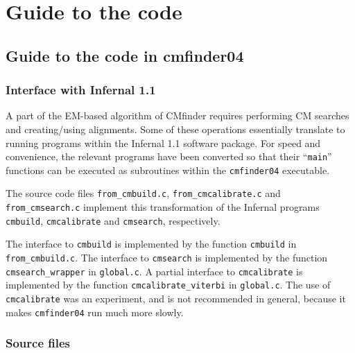 \documentclass[letterpaper,12pt]{report}
\begin{document}
\chapter{Guide to the code}

\section{Guide to the code in cmfinder04}

\subsection{Interface with Infernal 1.1}

A part of the EM-based algorithm of CMfinder requires performing CM searches and creating/using alignments.  Some of these operations essentially translate to running programs within the Infernal 1.1 software package.  For speed and convenience, the relevant programs have been converted so that their ``{\tt main}'' functions can be executed as subroutines within the {\tt cmfinder04} executable.

The source code files {\tt from\_cmbuild.c}, {\tt from\_cmcalibrate.c} and {\tt from\_cmsearch.c} implement this transformation of the Infernal programs {\tt cmbuild}, {\tt cmcalibrate} and {\tt cmsearch}, respectively.

The interface to {\tt cmbuild} is implemented by the function {\tt cmbuild} in {\tt from\_cmbuild.c}.  The interface to {\tt cmsearch} is implemented by the function {\tt cmsearch\_wrapper} in {\tt global.c}.  A partial interface to {\tt cmcalibrate} is implemented by the function {\tt cmcalibrate\_viterbi} in {\tt global.c}.  The use of {\tt cmcalibrate} was an experiment, and is not recommended in general, because it makes {\tt cmfinder04} run much more slowly.

\subsection{Source files}
\end{document}
